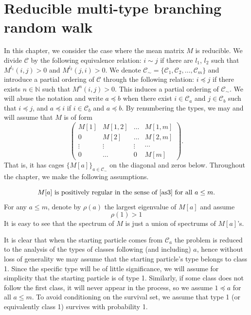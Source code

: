 \documentclass[12pt]{article}
\numberwithin{equation}{section}
\begin{document}
\section{Reducible multi-type branching random walk}
In this chapter, we consider the case where the mean matrix $M$ is reducible. We divide $\mathcal{C}$ by the following equivalence relation: $i\sim j$ if there are $l_1$, $l_2$ such that $M^{l_1}(i,j) >0$ and $M^{l_2}(j,i) > 0$. We denote $\mathcal{C}_\sim = \{\mathcal{C}_1,\mathcal{C}_2, \dots, \mathcal{C}_m\}$ and introduce a partial ordering of $\mathcal{C}$ through the following relation: $i \preceq j$ if there exists $n \in \mathbb{N}$ such that $M^n(i,j) >0 $. This induces a partial ordering of $\mathcal{C}_\sim$. We will abuse the notation and write $a \preceq b$ when there exist $i \in \mathcal{C}_a$ and  $j \in \mathcal{C}_b$  such that $i \preceq j$, and $a \preceq i$ if $i \in \mathcal{C}_b$ and $a \preceq b$. By renumbering the types, we may and will assume that $M$ is of form
\begin{equation}\label{matrix}
    \begin{pmatrix}
        M[1] & M[1,2] & \dots & M[1,m] \\
        0 & M[2] & \dots & M[2,m]\\
        \vdots & \vdots & \vdots & \cdots \\
        0 & \dots & 0 & M[m]
    \end{pmatrix}
    .
\end{equation}
 That is, it has cages $\{M[a]\}_{a \in \mathcal{C}_\sim}$ on the diagonal and zeros below.  Throughout the chapter, we make the following assumptions. 

\begin{equation}\label{as4}
    M[a] \text{ is positively regular in the sense of }\eqref{as3}\text{ for all } a \leq m.
\end{equation}
 For any $a \leq m$, denote by $\rho(a)$ the largest eigenvalue of $M[a]$ and assume
  \begin{equation}\label{as5}
      \rho(1) >1 
  \end{equation}
  It is easy to see that the spectrum of $M$ is just a union of spectrums of $M[a]$'s.

 It is clear that when the starting particle comes from $\mathcal{C}_a$ the problem is reduced to the analysis of the types of classes following (and including) $a$, hence without loss of generality we may assume that the starting particle's type belongs to class 1. Since the specific type will be of little significance, we will assume for simplicity that the starting particle is of type 1. Similarly, if some class does not follow the first class, it will never appear in the process, so we assume $1 \preceq a$ for all $a \leq m$. To avoid conditioning on the survival set, we assume that type 1 (or equivalently class 1) survives with probability 1. 
\end{document}
